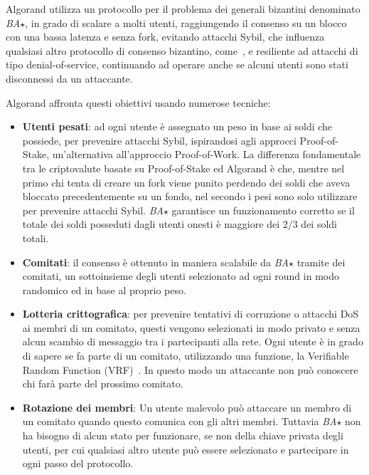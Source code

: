 Algorand utilizza un protocollo per il problema dei generali bizantini denominato \emph{BA$\star$}, in grado di scalare a molti utenti, raggiungendo il consenso su un blocco con una bassa latenza e senza fork, evitando attacchi Sybil, che influenza qualsiasi altro protocollo di consenso bizantino, come~\cite{castro1999practical}, e resiliente ad attacchi di tipo denial-of-service, continuando ad operare anche se alcuni utenti sono stati disconnessi da un attaccante.

Algorand affronta questi obiettivi usando numerose tecniche:
\begin{itemize}
	\item \textbf{Utenti pesati}: ad ogni utente è assegnato un peso in base ai soldi che possiede, per prevenire attacchi Sybil, ispirandosi agli approcci Proof-of-Stake, un'alternativa all'approccio Proof-of-Work. La differenza fondamentale tra le criptovalute basate su Proof-of-Stake ed Algorand è che, mentre nel primo chi tenta di creare un fork viene punito perdendo dei soldi che aveva bloccato precedentemente su un fondo, nel secondo i pesi sono solo utilizzare per prevenire attacchi Sybil. \emph{BA$\star$} garantisce un funzionamento corretto se il totale dei soldi posseduti dagli utenti onesti è maggiore dei $2/3$ dei soldi totali.
	\item \textbf{Comitati}: il consenso è ottenuto in maniera scalabile da \emph{BA$\star$} tramite dei comitati, un sottoinsieme degli utenti selezionato ad ogni round in modo randomico ed in base al proprio peso.
	\item \textbf{Lotteria crittografica}: per prevenire tentativi di corruzione o attacchi DoS ai membri di un comitato, questi vengono selezionati in modo privato e senza alcun scambio di messaggio tra i partecipanti alla rete. Ogni utente è in grado di sapere se fa parte di un comitato, utilizzando una funzione, la Verifiable Random Function (VRF)~\cite{micali1999verifiable}. In questo modo un attaccante non può conoscere chi farà parte del prossimo comitato.
	\item \textbf{Rotazione dei membri}: Un utente malevolo può attaccare un membro di un comitato quando questo comunica con gli altri membri. Tuttavia \emph{BA$\star$} non ha bisogno di alcun stato per funzionare, se non della chiave privata degli utenti, per cui qualsiasi altro utente può essere selezionato e partecipare in ogni passo del protocollo.
\end{itemize}

